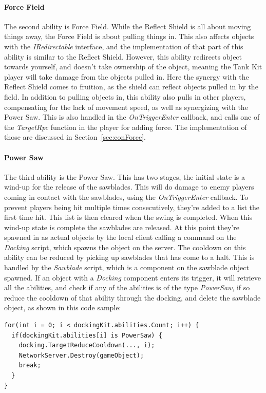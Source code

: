 \paragraph{Force Field}
The second ability is Force Field. While the Reflect Shield is all about moving things away, the Force Field is about pulling things in. This also affects objects with the \emph{IRedirectable} interface, and the implementation of that part of this ability is similar to the Reflect Shield. However, this ability redirects object towards yourself, and doesn't take ownership of the object, meaning the Tank Kit player will take damage from the objects pulled in. Here the synergy with the Reflect Shield comes to fruition, as the shield can reflect objects pulled in by the field. In addition to pulling objects in, this ability also pulls in other players, compensating for the lack of movement speed, as well as synergizing with the Power Saw. This is also handled in the \emph{OnTriggerEnter} callback, and calls one of the \emph{TargetRpc} function in the player for adding force. The implementation of those are discussed in Section~\ref{sec:conForce}.

\paragraph{Power Saw}
The third ability is the Power Saw. This has two stages, the initial state is a wind-up for the release of the sawblades. This will do damage to enemy players coming in contact with the sawblades, using the \emph{OnTriggerEnter} callback. To prevent players being hit multiple times consecutively, they're added to a list the first time hit. This list is then cleared when the swing is completed. When this wind-up state is complete the sawblades are released. At this point they're spawned in as actual objects by the local client calling a command on the \emph{Docking} script, which spawns the object on the server. The cooldown on this ability can be reduced by picking up sawblades that has come to a halt. This is handled by the \emph{Sawblade} script, which is a component on the sawblade object spawned. If an object with a \emph{Docking} component enters its trigger, it will retrieve all the abilities, and check if any of the abilities is of the type \emph{PowerSaw}, if so reduce the cooldown of that ability through the docking, and delete the sawblade object, as shown in this code sample:

\begin{verbatim}
for(int i = 0; i < dockingKit.abilities.Count; i++) {
  if(dockingKit.abilities[i] is PowerSaw) {
    docking.TargetReduceCooldown(..., i);
    NetworkServer.Destroy(gameObject);
    break;
  }
}
\end{verbatim}

